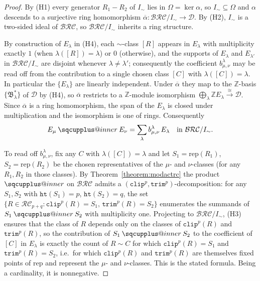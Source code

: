\documentclass[a4paper,fleqn]{cas-sc}
\makeatletter
\newcommand{\sqcupplus@inner}[2]{%
  \vcenter{\hbox{\ooalign{%
    \hfil$\m@th#1\sqcup$\hfil\cr
    \hfil\raisebox{0.15ex}{$\m@th#1\scriptscriptstyle+$}\hfil\cr
  }}}%
}
\newcommand{\sqcupplus}{\mathbin{\mathpalette\sqcupplus@inner\relax}}
\theoremstyle{definition}
\theoremstyle{remark}
\numberwithin{equation}{subsection}
\newcommand{\trm}{\mathtt{trim}}
\newcommand{\hr}{\mathtt{ht}}
\newcommand{\clp}{\mathtt{clip}}
\newcommand{\BRC}{\mathcal{BRC}}
\newcommand{\RC}{\mathcal{RC}}
\newcommand{\dcoma}{\mathcal{D}}
\makeatother
\begin{document}
\begin{proof}
By (H1) every generator $R_1-R_2$ of $I_\sim$ lies in $\Omega=\ker\alpha$, so $I_\sim\subseteq\Omega$ and $\alpha$ descends to a surjective ring homomorphism $\overline\alpha:\BRC/I_\sim\to\dcoma$. By (H2), $I_\sim$ is a two-sided ideal of $\BRC$, so $\BRC/I_\sim$ inherits a ring structure.

By construction of $E_\lambda$ in (H4), each $\sim$-class $[R]$ appears in $E_\lambda$ with multiplicity exactly $1$ (when $\lambda([R])=\lambda$) or $0$ (otherwise), and the supports of $E_\lambda$ and $E_{\lambda'}$ in $\BRC/I_\sim$ are disjoint whenever $\lambda\neq\lambda'$; consequently the coefficient $b_{\mu,\nu}^\lambda$ may be read off from the contribution to a single chosen class $[C]$ with $\lambda([C])=\lambda$. In particular the $\{E_\lambda\}$ are linearly independent. Under $\overline\alpha$ they map to the $\mathbb{Z}$-basis $\{\mathfrak{B}_\lambda^*\}$ of $\dcoma$ by (H4), so $\overline\alpha$ restricts to a $\mathbb{Z}$-module isomorphism $\bigoplus_\lambda\mathbb{Z}E_\lambda\xrightarrow{\;\cong\;}\dcoma$. Since $\overline\alpha$ is a ring homomorphism, the span of the $E_\lambda$ is closed under multiplication and the isomorphism is one of rings. Consequently
$$E_\mu \sqcupplus E_\nu = \sum_\lambda b_{\mu,\nu}^\lambda\, E_\lambda \quad\text{in } \BRC/I_\sim.$$

To read off $b_{\mu,\nu}^\lambda$, fix any $C$ with $\lambda([C])=\lambda$ and let $S_1=\mathrm{rep}(R_1)$, $S_2=\mathrm{rep}(R_2)$ be the chosen representatives of the $\mu$- and $\nu$-classes (for any $R_1,R_2$ in those classes). By Theorem~\ref{theorem:modactrc} the product $\sqcupplus$ on $\BRC$ admits a $(\clp^p,\trm^p)$-decomposition: for any $S_1,S_2$ with $\hr(S_1)=p$, $\hr(S_2)=q$, the set $\{R\in\RC_{p+q}:\clp^p(R)=S_1,\,\trm^p(R)=S_2\}$ enumerates the summands of $S_1\sqcupplus S_2$ with multiplicity one. Projecting to $\BRC/I_\sim$, (H3) ensures that the class of $R$ depends only on the classes of $\clp^p(R)$ and $\trm^p(R)$, so the contribution of $S_1\sqcupplus S_2$ to the coefficient of $[C]$ in $E_\lambda$ is exactly the count of $R\sim C$ for which $\clp^p(R)=S_1$ and $\trm^p(R)=S_2$, i.e.\ for which $\clp^p(R)$ and $\trm^p(R)$ are themselves fixed points of $\mathrm{rep}$ and represent the $\mu$- and $\nu$-classes. This is the stated formula. Being a cardinality, it is nonnegative.


\end{proof}
\end{document}
